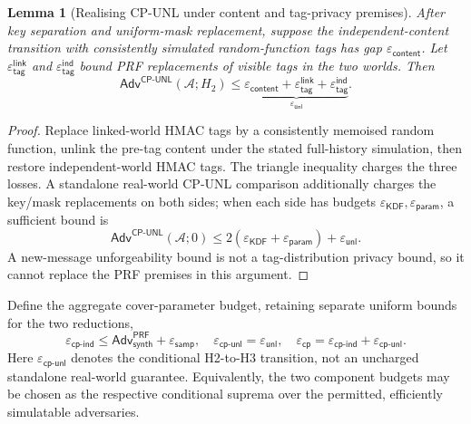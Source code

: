 \documentclass[pdflatex,sn-mathphys-num]{sn-jnl}%
\newtheorem{lemma}{Lemma}
\theoremstyle{definition}
\theoremstyle{game}
\theoremstyle{thmstyleone}%
\theoremstyle{thmstyletwo}%
\theoremstyle{thmstylethree}%
\begin{document}
\begin{lemma}[Realising CP-UNL under content and tag-privacy premises]
\label{lem:cpunl}
After key separation and uniform-mask replacement, suppose the
independent-content transition with consistently simulated random-function
tags has gap $\varepsilon_{\mathsf{content}}$. Let
$\varepsilon_{\mathsf{tag}}^{\mathsf{link}}$ and
$\varepsilon_{\mathsf{tag}}^{\mathsf{ind}}$ bound PRF replacements of visible
tags in the two worlds. Then
\[
\mathsf{Adv}^{\mathsf{CP\text{-}UNL}}(\mathcal A;H_2)\le
\underbrace{\varepsilon_{\mathsf{content}}
+\varepsilon_{\mathsf{tag}}^{\mathsf{link}}
+\varepsilon_{\mathsf{tag}}^{\mathsf{ind}}}_{\varepsilon_{\mathsf{unl}}}.
\]
\end{lemma}
\begin{proof}
Replace linked-world HMAC tags by a consistently memoised random function,
unlink the pre-tag content under the stated full-history simulation, then
restore independent-world HMAC tags. The triangle inequality charges the
three losses. A standalone real-world CP-UNL comparison additionally charges
the key/mask replacements on both sides; when each side has budgets
$\varepsilon_{\mathsf{KDF}},\varepsilon_{\mathsf{param}}$, a sufficient bound is
\[
\mathsf{Adv}^{\mathsf{CP\text{-}UNL}}(\mathcal A;0)
\le2(\varepsilon_{\mathsf{KDF}}+\varepsilon_{\mathsf{param}})+\varepsilon_{\mathsf{unl}}.
\]
A new-message unforgeability bound is not a tag-distribution
privacy bound, so it cannot replace the PRF premises in this argument.
\end{proof}

\noindent Define the aggregate cover-parameter budget, retaining separate
uniform bounds for the two reductions,
\[
\varepsilon_{\mathsf{cp\text{-}ind}}
\le\mathsf{Adv}^{\mathsf{PRF}}_{\mathsf{synth}}+\varepsilon_{\mathsf{samp}},
\quad
\varepsilon_{\mathsf{cp\text{-}unl}}=\varepsilon_{\mathsf{unl}},
\quad
\varepsilon_{\mathsf{cp}}=
\varepsilon_{\mathsf{cp\text{-}ind}}+\varepsilon_{\mathsf{cp\text{-}unl}}.
\]
Here $\varepsilon_{\mathsf{cp\text{-}unl}}$ denotes the conditional H2-to-H3
transition, not an uncharged standalone real-world guarantee.
Equivalently, the two component budgets may be chosen as the respective conditional
suprema over the permitted, efficiently simulatable adversaries.
\end{document}

